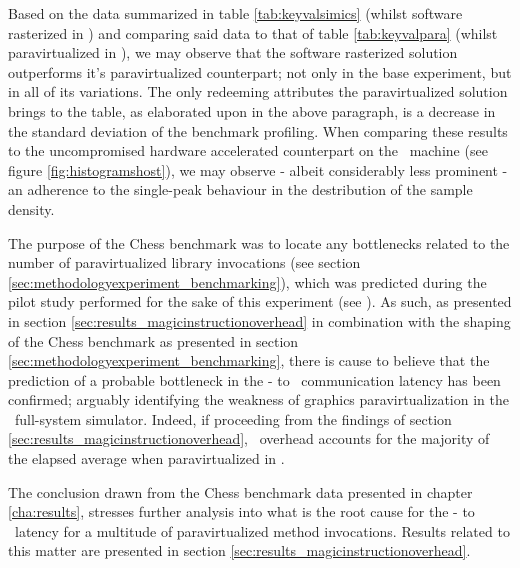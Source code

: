 Based on the data summarized in table \ref{tab:keyvalsimics} (whilst software rasterized in \dvttermsimics ) and comparing said data to that of table \ref{tab:keyvalpara} (whilst paravirtualized in \dvttermsimics ), we may observe that the software rasterized solution outperforms it's paravirtualized counterpart; not only in the base experiment, but in all of its variations.
The only redeeming attributes the paravirtualized solution brings to the table, as elaborated upon in the above paragraph, is a decrease in the standard deviation of the benchmark profiling.
When comparing these results to the uncompromised hardware accelerated counterpart on the \dvttermhost\ machine (see figure \ref{fig:histogramshost}), we may observe - albeit considerably less prominent - an adherence to the single-peak behaviour in the destribution of the sample density.

The purpose of the Chess benchmark was to locate any bottlenecks related to the number of paravirtualized library invocations (see section \ref{sec:methodologyexperiment_benchmarking}), which was predicted during the pilot study performed for the sake of this experiment (see ).
As such, as presented in section \ref{sec:results_magicinstructionoverhead} in combination with the shaping of the Chess benchmark as presented in section \ref{sec:methodologyexperiment_benchmarking}, there is cause to believe that the prediction of a probable bottleneck in the \dvttermtarget - to \dvttermhost\ communication latency has been confirmed; arguably identifying the weakness of graphics paravirtualization in the \dvttermsimics\ full-system simulator.
Indeed, if proceeding from the findings of section \ref{sec:results_magicinstructionoverhead}, \dvttermmagicinstruction\ overhead accounts for the majority of the elapsed average when paravirtualized in \dvttermsimics .


The conclusion drawn from the Chess benchmark data presented in chapter \ref{cha:results}, stresses further analysis into what is the root cause for the \dvttermtarget - to \dvttermhost\ latency for a multitude of paravirtualized method invocations.
Results related to this matter are presented in section \ref{sec:results_magicinstructionoverhead}. 




